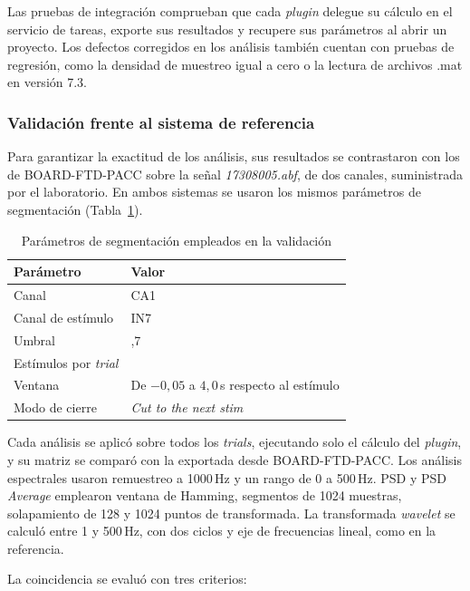 \documentclass[12pt,letterpaper,oneside]{article}
\begin{document}
Las pruebas de integración comprueban que cada \textit{plugin} delegue su cálculo en el servicio de tareas, exporte sus resultados y recupere sus parámetros al abrir un proyecto. Los defectos corregidos en los análisis también cuentan con pruebas de regresión, como la densidad de muestreo igual a cero o la lectura de archivos .mat en versión 7.3.

\subsubsection{Validación frente al sistema de referencia}

Para garantizar la exactitud de los análisis, sus resultados se contrastaron con los de BOARD-FTD-PACC sobre la señal \textit{17308005.abf}, de dos canales, suministrada por el laboratorio. En ambos sistemas se usaron los mismos parámetros de segmentación (Tabla~\ref{tab:pruebas_segmentacion}).

\begin{table}[H]
\centering
\scriptsize
\renewcommand{\arraystretch}{1.3}
\begin{tabularx}{\textwidth}{|l|>{\raggedright\arraybackslash}X|}
\hline
\textbf{Parámetro} & \textbf{Valor} \\
\hline
Canal & CA1 \\
\hline
Canal de estímulo & IN7 \\
\hline
Umbral & 0,7 \\
\hline
Estímulos por \textit{trial} & 1 \\
\hline
Ventana & De $-0{,}05$ a $4{,}0$\,s respecto al estímulo \\
\hline
Modo de cierre & \textit{Cut to the next stim} \\
\hline
\end{tabularx}
\caption{Parámetros de segmentación empleados en la validación}
\label{tab:pruebas_segmentacion}
\end{table}

Cada análisis se aplicó sobre todos los \textit{trials}, ejecutando solo el cálculo del \textit{plugin}, y su matriz se comparó con la exportada desde BOARD-FTD-PACC. Los análisis espectrales usaron remuestreo a 1000\,Hz y un rango de 0 a 500\,Hz. PSD y PSD \textit{Average} emplearon ventana de Hamming, segmentos de 1024 muestras, solapamiento de 128 y 1024 puntos de transformada. La transformada \textit{wavelet} se calculó entre 1 y 500\,Hz, con dos ciclos y eje de frecuencias lineal, como en la referencia.

La coincidencia se evaluó con tres criterios:
\end{document}
